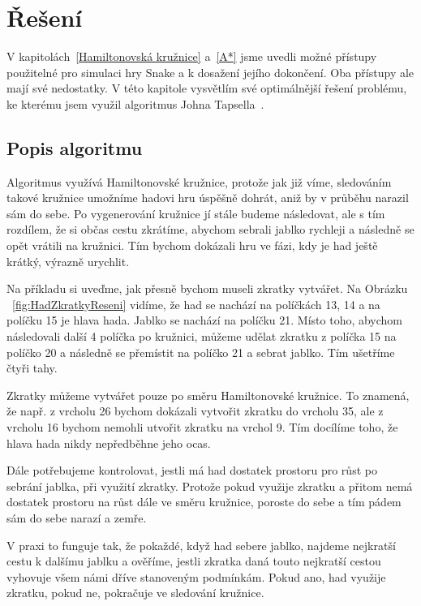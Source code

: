 \chapter{Řešení}\label{Řešení}
V kapitolách~\ref{Hamiltonovská kružnice} a~\ref{A*} jsme uvedli možné přístupy použitelné pro simulaci hry Snake a k dosažení jejího dokončení. Oba přístupy ale mají své nedostatky. V této kapitole vysvětlím své optimálnější řešení problému, ke kterému jsem využil algoritmus Johna Tapsella~\cite{tapsell2025snake}.

\section{Popis algoritmu}

Algoritmus využívá Hamiltonovské kružnice, protože jak již víme, sledováním takové kružnice umožníme hadovi hru úspěšně dohrát, aniž by v průběhu narazil sám do sebe. Po vygenerování kružnice jí stále budeme následovat, ale s tím rozdílem, že si občas cestu zkrátíme, abychom sebrali jablko rychleji a následně se opět vrátili na kružnici. Tím bychom dokázali hru ve fázi, kdy je had ještě krátký, výrazně urychlit. 

Na příkladu si uveďme, jak přesně bychom museli zkratky vytvářet. Na Obrázku ~\ref{fig:HadZkratkyReseni} vidíme, že had se nachází na políčkách 13, 14 a na políčku 15 je hlava hada. Jablko se nachází na políčku 21. Místo toho, abychom následovali další 4 políčka po kružnici, můžeme udělat zkratku z políčka 15 na políčko 20 a následně se přemístit na políčko 21 a sebrat jablko. Tím ušetříme čtyři tahy. 

Zkratky můžeme vytvářet pouze po směru Hamiltonovské kružnice. To znamená, že např. z vrcholu 26 bychom dokázali vytvořit zkratku do vrcholu 35, ale z vrcholu 16 bychom nemohli utvořit zkratku na vrchol 9. Tím docílíme toho, že hlava hada nikdy nepředběhne jeho ocas. 

Dále potřebujeme kontrolovat, jestli má had dostatek prostoru pro růst po sebrání jablka, při využití zkratky. Protože pokud využije zkratku a přitom nemá dostatek prostoru na růst dále ve směru kružnice, poroste do sebe a tím pádem sám do sebe narazí a zemře.

V praxi to funguje tak, že pokaždé, když had sebere jablko, najdeme nejkratší cestu k dalšímu jablku a ověříme, jestli zkratka daná touto nejkratší cestou vyhovuje všem námi dříve stanoveným podmínkám. Pokud ano, had využije zkratku, pokud ne, pokračuje ve sledování kružnice.

